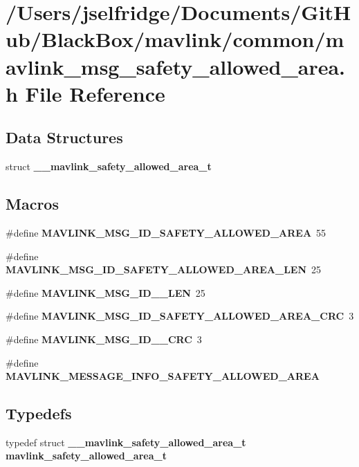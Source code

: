 \section{/\+Users/jselfridge/\+Documents/\+Git\+Hub/\+Black\+Box/mavlink/common/mavlink\+\_\+msg\+\_\+safety\+\_\+allowed\+\_\+area.h File Reference}
\label{mavlink__msg__safety__allowed__area_8h}
\subsection*{Data Structures}
\begin{DoxyCompactItemize}
\item 
struct \textbf{ \+\_\+\+\_\+mavlink\+\_\+safety\+\_\+allowed\+\_\+area\+\_\+t}
\end{DoxyCompactItemize}
\subsection*{Macros}
\begin{DoxyCompactItemize}
\item 
\#define \textbf{ M\+A\+V\+L\+I\+N\+K\+\_\+\+M\+S\+G\+\_\+\+I\+D\+\_\+\+S\+A\+F\+E\+T\+Y\+\_\+\+A\+L\+L\+O\+W\+E\+D\+\_\+\+A\+R\+EA}~55
\item 
\#define \textbf{ M\+A\+V\+L\+I\+N\+K\+\_\+\+M\+S\+G\+\_\+\+I\+D\+\_\+\+S\+A\+F\+E\+T\+Y\+\_\+\+A\+L\+L\+O\+W\+E\+D\+\_\+\+A\+R\+E\+A\+\_\+\+L\+EN}~25
\item 
\#define \textbf{ M\+A\+V\+L\+I\+N\+K\+\_\+\+M\+S\+G\+\_\+\+I\+D\+\_\+\_\+\+L\+EN}~25
\item 
\#define \textbf{ M\+A\+V\+L\+I\+N\+K\+\_\+\+M\+S\+G\+\_\+\+I\+D\+\_\+\+S\+A\+F\+E\+T\+Y\+\_\+\+A\+L\+L\+O\+W\+E\+D\+\_\+\+A\+R\+E\+A\+\_\+\+C\+RC}~3
\item 
\#define \textbf{ M\+A\+V\+L\+I\+N\+K\+\_\+\+M\+S\+G\+\_\+\+I\+D\+\_\+\_\+\+C\+RC}~3
\item 
\#define \textbf{ M\+A\+V\+L\+I\+N\+K\+\_\+\+M\+E\+S\+S\+A\+G\+E\+\_\+\+I\+N\+F\+O\+\_\+\+S\+A\+F\+E\+T\+Y\+\_\+\+A\+L\+L\+O\+W\+E\+D\+\_\+\+A\+R\+EA}
\end{DoxyCompactItemize}
\subsection*{Typedefs}
\begin{DoxyCompactItemize}
\item 
typedef struct \textbf{ \+\_\+\+\_\+mavlink\+\_\+safety\+\_\+allowed\+\_\+area\+\_\+t} \textbf{ mavlink\+\_\+safety\+\_\+allowed\+\_\+area\+\_\+t}
\end{DoxyCompactItemize}


